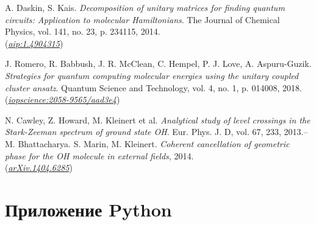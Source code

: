 \documentclass[a4paper]{report}
\begin{document}
\begin{thebibliography}{99}
    A. Daskin, S. Kais. \textit{Decomposition of unitary matrices for finding quantum circuits: Application to molecular Hamiltonians}. The Journal of Chemical Physics, vol. 141, no. 23, p. 234115, 2014.\\
    (\href{https://aip.scitation.org/doi/10.1063/1.4904315}{\textit{aip:1.4904315}})

    J. Romero, R. Babbush, J. R. McClean, C. Hempel, P. J. Love, A. Aspuru-Guzik. \textit{Strategies for quantum computing molecular energies using the unitary coupled cluster ansatz}. Quantum Science and Technology, vol. 4, no. 1, p. 014008, 2018.\\
    (\href{https://iopscience.iop.org/article/10.1088/2058-9565/aad3e4} {\textit{iopscience:2058-9565/aad3e4}})

    \label{Cawley2013}
    N. Cawley, Z. Howard, M. Kleinert et al. \textit{Analytical study of level crossings in the Stark-Zeeman spectrum of ground state OH}. Eur. Phys. J. D, vol. 67, 233, 2013.\;--\; M. Bhattacharya. S. Marin, M. Kleinert. \textit{Coherent cancellation of geometric phase for the OH molecule in external fields}, 2014.\\
    (\href{https://doi.org/10.48550/arXiv.1404.6285}{\textit{arXiv.1404.6285}})

\end{thebibliography}


\chapter*{Приложение Python}
\end{document}
